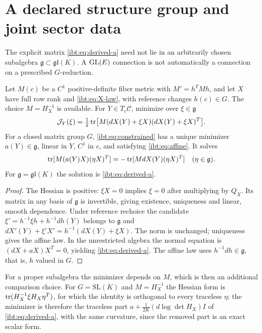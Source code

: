 \section{A declared structure group and joint sector data}
\label{ibt:sec:group}

The explicit matrix \cref{ibt:eq:derived-a} need not lie in an arbitrarily chosen subalgebra $\mathfrak g\subset\mathfrak{gl}(K)$. A $\mathrm{GL}(E)$ connection is not automatically a connection on a prescribed $G$-reduction.

Let $M(c)$ be a $C^1$ positive-definite fiber metric with $M'=h^TMh$, and let $X$ have full row rank and \cref{ibt:eq:X-law}, with reference changes $h(c)\in G$. The choice $M=H_X^{-1}$ is available. For $Y\in T_c\mathcal C$, minimize over $\xi\in\mathfrak g$
\begin{equation}
 \mathcal J_Y(\xi)=\tfrac12\operatorname{tr}\bigl[M(d X(Y)+\xi X)
                            (d X(Y)+\xi X)^T\bigr].
 \label{ibt:eq:constrained}
\end{equation}
For a closed matrix group $G$, \cref{ibt:eq:constrained} has a unique minimizer $a(Y)\in\mathfrak g$, linear in $Y$, $C^1$ in $c$, and satisfying \cref{ibt:eq:affine}. It solves
\begin{equation}
 \operatorname{tr}[M(a(Y)X)(\eta X)^T]
 =-\operatorname{tr}[Md X(Y)(\eta X)^T]\quad(\eta\in\mathfrak g).
 \label{ibt:eq:group-normal}
\end{equation}
For $\mathfrak g=\mathfrak{gl}(K)$ the solution is \cref{ibt:eq:derived-a}.
\begin{proof}
The Hessian is positive: $\xi X=0$ implies $\xi=0$ after multiplying by $Q_X$. Its matrix in any basis of $\mathfrak g$ is invertible, giving existence, uniqueness and linear, smooth dependence. Under reference rechoice the candidate $\xi'=h^{-1}\xi h+h^{-1}d h(Y)$ belongs to $\mathfrak g$ and $d X'(Y)+\xi'X'=h^{-1}(d X(Y)+\xi X)$. The norm is unchanged; uniqueness gives the affine law. In the unrestricted algebra the normal equation is $(d X+aX)X^T=0$, yielding \cref{ibt:eq:derived-a}. The affine law uses $h^{-1}dh\in\mathfrak g$, that is, $h$ valued in $G$.
\end{proof}

For a proper subalgebra the minimizer depends on $M$, which is then an additional comparison choice. For $G=\mathrm{SL}(K)$ and $M=H_X^{-1}$ the Hessian form is $\operatorname{tr}(H_X^{-1}\xi H_X\eta^T)$, for which the identity is orthogonal to every traceless $\eta$; the minimizer is therefore the traceless part $a+\tfrac1{2K}(d\log\det H_X)I$ of \cref{ibt:eq:derived-a}, with the same curvature, since the removed part is an exact scalar form.

